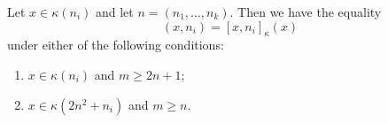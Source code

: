 Let $x \in \kappa(n_i)$ and let $n = (n_1, \ldots, n_k)$. Then we have the equality
$$(x, n_i) = [x, n_i]_{\kappa}(x)$$
under either of the following conditions:
\begin{enumerate}
\item[(i)] $x \in \kappa(n_i)$ and $m \ge 2n + 1$;
\item[(ii)] $x \in \kappa(2n^2 + n_i)$ and $m \ge n$.
\end{enumerate}
